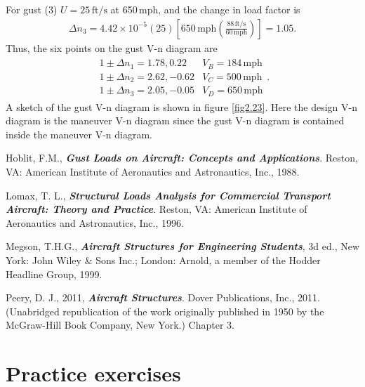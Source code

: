 \documentclass{AeroStructure-ERJohnson}
\begin{document}
For gust (3) $U=25\,\mathrm{ft}/\mathrm{s}$ at 650\,mph, and the change in load factor is\pagebreak
\begin{align}\label{ex2.6q}
\Delta n_{3}=4.42 \times 10^{-5}(25)\left[650\,\mathrm{mph}\left(\frac{88\,\mathrm{ft}/ \mathrm{s}}{60\,\mathrm{mph}}\right)\right]=1.05.
\end{align}
Thus, the six points on the gust V-n diagram are
\begin{align}\label{ex2.6r}
\begin{array}{ll}
1 \pm \Delta n_{1}=1.78,0.22 & V_{B}=184\,\mathrm{mph} \\
1 \pm \Delta n_{2}=2.62,-0.62 & V_{C}=500\,\mathrm{mph} \\
1 \pm \Delta n_{3}=2.05,-0.05 & V_{D}=650\,\mathrm{mph}
\end{array}.
\end{align}
A sketch of the gust V-n diagram is shown in figure \ref{fig2.23}. Here the design V-n diagram is the maneuver V-n diagram since the gust V-n diagram is contained inside the maneuver V-n diagram.


\begin{thebibliography}{}
\bibitem{}
Hoblit, F.M., \textbf{\textit{Gust Loads on Aircraft: Concepts and Applications}}. Reston, VA: American Institute of Aeronautics and Astronautics, Inc., 1988.

\bibitem{}\label{Lomax}
Lomax, T. L., \textbf{\textit{Structural Loads Analysis for Commercial Transport Aircraft: Theory and Practice}}. Reston, VA: American Institute of Aeronautics and Astronautics, Inc., 1996.

\bibitem{}\label{Megson}
Megson, T.H.G., \textbf{\textit{Aircraft Structures for Engineering Students}}, 3d ed., New York: John Wiley \& Sons Inc.; London: Arnold, a member of the Hodder Headline Group, 1999.

\bibitem{}\label{Peery}
Peery, D. J., 2011, \textbf{\textit{Aircraft Structures}}. Dover Publications, Inc., 2011. (Unabridged republication of the work originally published in 1950 by the McGraw-Hill Book Company, New York.) Chapter 3.
\end{thebibliography}

\section{Practice exercises}\label{sec2.7}
\end{document}
